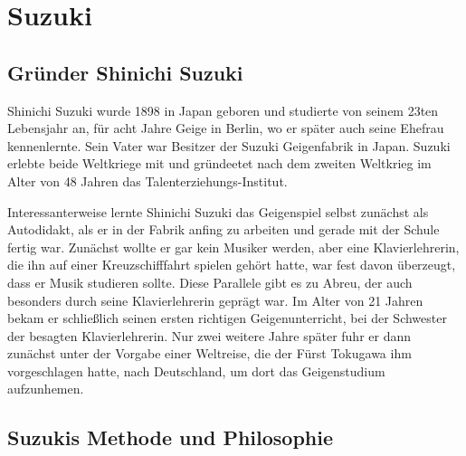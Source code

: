 \section{Suzuki}

\subsection{Gründer Shinichi Suzuki}

Shinichi Suzuki wurde 1898 in Japan geboren und studierte von seinem 23ten
Lebensjahr an, für acht Jahre Geige in Berlin, wo er später auch seine Ehefrau
kennenlernte. Sein Vater war Besitzer der Suzuki Geigenfabrik in Japan. Suzuki
erlebte beide Weltkriege mit und gründeetet nach dem zweiten Weltkrieg im Alter
von 48 Jahren das Talenterziehungs-Institut. 

Interessanterweise lernte Shinichi Suzuki das Geigenspiel selbst zunächst als
Autodidakt, als er in der Fabrik anfing zu arbeiten und gerade mit der Schule
fertig war. Zunächst wollte er gar kein Musiker werden, aber eine
Klavierlehrerin, die ihn auf einer Kreuzschifffahrt spielen gehört hatte, war
fest davon überzeugt, dass er Musik studieren sollte.
\autocite[89]{suzuki:erziehung_ist_liebe} Diese Parallele gibt es zu Abreu, der
auch besonders durch seine Klavierlehrerin geprägt war. Im Alter von 21 Jahren
bekam er schließlich seinen ersten richtigen Geigenunterricht, bei der Schwester
der besagten Klavierlehrerin. Nur zwei weitere Jahre später fuhr er dann
zunächst unter der Vorgabe einer Weltreise, die der Fürst Tokugawa ihm
vorgeschlagen hatte, nach Deutschland, um dort das Geigenstudium aufzunhemen.
\autocite[90ff]{suzuki:erziehung_ist_liebe}



\subsection{Suzukis Methode und Philosophie}


